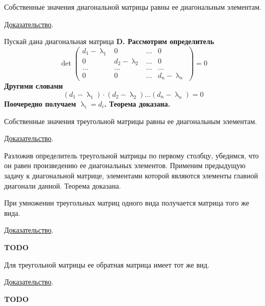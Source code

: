 \documentclass[../../calc-math-exam-2023.tex]{subfiles}
\begin{document}
    \begin{theorem}
        Собственные значения диагональной матрицы равны ее диагональным элементам.

        \underline{Доказательство}.

        Пускай дана диагональная матрица \bf{D}. Рассмотрим определитель
        \begin{equation*}
            \det
            \begin{pmatrix}
                d_1 - \uplambda_1 & 0                 & \dots & 0                 \\
                0                 & d_2 - \uplambda_2 & \dots & 0                 \\
                \dots             & \dots             & \dots & \dots             \\
                0                 & 0                 & \dots & d_n - \uplambda_n
            \end{pmatrix}
            = 0
        \end{equation*}
        Другими словами
        \begin{equation*}
            \left( d_1 - \uplambda_1 \right) \cdot \left( d_2 - \uplambda_2 \right) \dots \left( d_n - \uplambda_n \right) = 0
        \end{equation*}
        Поочередно получаем $\displaystyle \uplambda_i = d_i$. Теорема доказана.
    \end{theorem}

    \begin{theorem}
        Собственные значения треугольной матрицы равны ее диагональным элементам.

        \underline{Доказательство}.

        Разложив определитель треугольной матрицы по первому столбцу, убедимся, что он равен произведению ее диагональных элементов.
        Применим предыдущую задачу к диагональной матрице, элементами которой являются элементы главной диагонали данной.
        Теорема доказана.
    \end{theorem}

    \begin{theorem}
        При умножении треугольных матриц одного вида получается матрица того же вида.

        \underline{Доказательство}.

        \bf{TODO}
    \end{theorem}

    \begin{theorem}
        Для треугольной матрицы ее обратная матрица имеет тот же вид.

        \underline{Доказательство}.

        \bf{TODO}
    \end{theorem}
\end{document}
